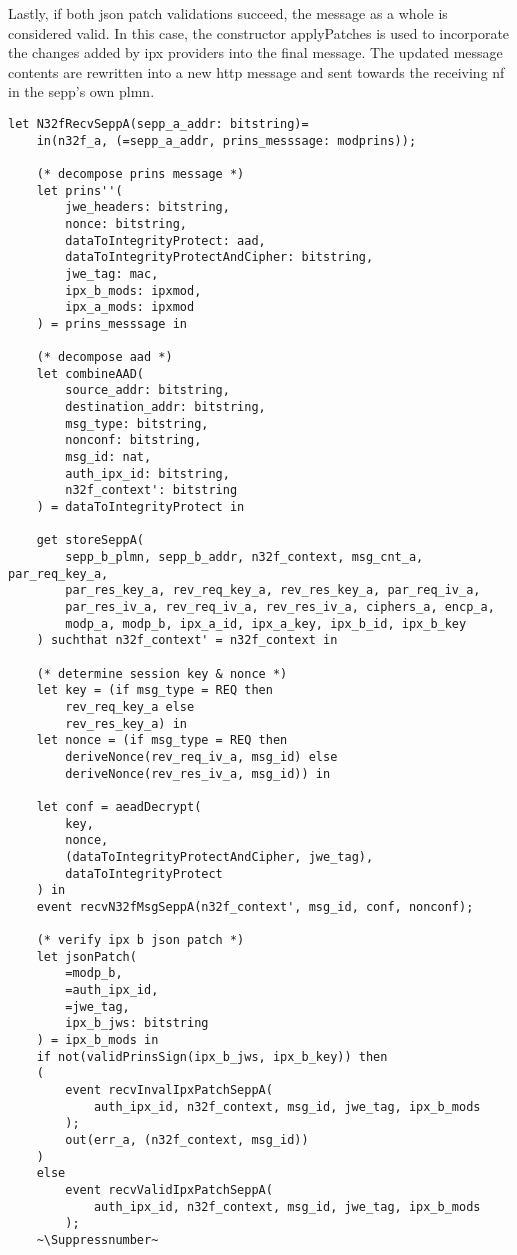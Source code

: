 Lastly, if both \gls{json} patch validations succeed, the message as a whole is considered valid.
In this case, the constructor {\sffamily applyPatches} is used to incorporate the changes added by \gls{ipx} providers into the final message.
The updated message contents are rewritten into a new \gls{http} message and sent towards the receiving \gls{nf} in the \gls{sepp}'s own \gls{plmn}.

\lstset{escapeinside=~~}
\begin{lstlisting}[caption={Definition of the receiving N32-f signaling transmission process},label={lst:n32f-recv},firstnumber=833]
let N32fRecvSeppA(sepp_a_addr: bitstring)=
    in(n32f_a, (=sepp_a_addr, prins_messsage: modprins));

    (* decompose prins message *)
    let prins''(
        jwe_headers: bitstring,
        nonce: bitstring,
        dataToIntegrityProtect: aad,
        dataToIntegrityProtectAndCipher: bitstring,
        jwe_tag: mac,
        ipx_b_mods: ipxmod,
        ipx_a_mods: ipxmod
    ) = prins_messsage in

    (* decompose aad *)
    let combineAAD(
        source_addr: bitstring,
        destination_addr: bitstring,
        msg_type: bitstring,
        nonconf: bitstring,
        msg_id: nat,
        auth_ipx_id: bitstring,
        n32f_context': bitstring
    ) = dataToIntegrityProtect in

    get storeSeppA(
        sepp_b_plmn, sepp_b_addr, n32f_context, msg_cnt_a, par_req_key_a,
        par_res_key_a, rev_req_key_a, rev_res_key_a, par_req_iv_a,
        par_res_iv_a, rev_req_iv_a, rev_res_iv_a, ciphers_a, encp_a,
        modp_a, modp_b, ipx_a_id, ipx_a_key, ipx_b_id, ipx_b_key
    ) suchthat n32f_context' = n32f_context in

    (* determine session key & nonce *)
    let key = (if msg_type = REQ then
        rev_req_key_a else
        rev_res_key_a) in
    let nonce = (if msg_type = REQ then
        deriveNonce(rev_req_iv_a, msg_id) else
        deriveNonce(rev_res_iv_a, msg_id)) in

    let conf = aeadDecrypt(
        key,
        nonce,
        (dataToIntegrityProtectAndCipher, jwe_tag),
        dataToIntegrityProtect
    ) in
    event recvN32fMsgSeppA(n32f_context', msg_id, conf, nonconf);

    (* verify ipx b json patch *)
    let jsonPatch(
        =modp_b,
        =auth_ipx_id,
        =jwe_tag,
        ipx_b_jws: bitstring
    ) = ipx_b_mods in
    if not(validPrinsSign(ipx_b_jws, ipx_b_key)) then
    (
        event recvInvalIpxPatchSeppA(
            auth_ipx_id, n32f_context, msg_id, jwe_tag, ipx_b_mods
        );
        out(err_a, (n32f_context, msg_id))
    )
    else
        event recvValidIpxPatchSeppA(
            auth_ipx_id, n32f_context, msg_id, jwe_tag, ipx_b_mods
        );
    ~\Suppressnumber~


\end{lstlisting}
